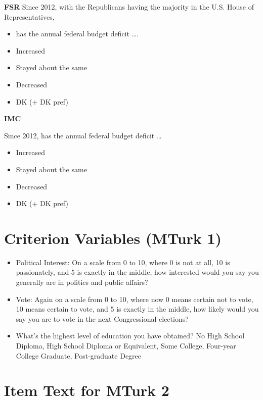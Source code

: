 \begin{itemize}
\textbf{FSR}\newline
Since 2012, with the Republicans having the majority in the U.S. House of
Representatives,
\begin{itemize}
	\item has the annual federal budget deficit \ldots.
	\item Increased
	\item Stayed about the same
	\item Decreased
	\item DK (+ DK pref)
\end{itemize}

\textbf{IMC}\newline

Since 2012, has the annual federal budget deficit \ldots
\begin{itemize}
	\item Increased
	\item Stayed about the same
	\item Decreased
	\item DK (+ DK pref)
\end{itemize}
\end{itemize}

\newpage

\clearpage
\section{Criterion Variables (MTurk 1)}\label{si:mturk1_criteria}
\begin{itemize}

    \item Political Interest: On a scale from 0 to 10, where 0 is not at all, 10 is passionately, and 5 is exactly in the middle, how interested would you say you generally are in politics and public affairs?

    \item Vote: Again on a scale from 0 to 10, where now 0 means certain not to vote, 10 means certain to vote, and 5 is exactly in the middle, how likely would you say you are to vote in the next Congressional elections?

    \item What's the highest level of education you have obtained? No High School Diploma, High School Diploma or Equivalent, Some College, Four-year College Graduate, Post-graduate Degree
\end{itemize}

\clearpage
\section{Item Text for MTurk 2}\label{si:mturk2}

